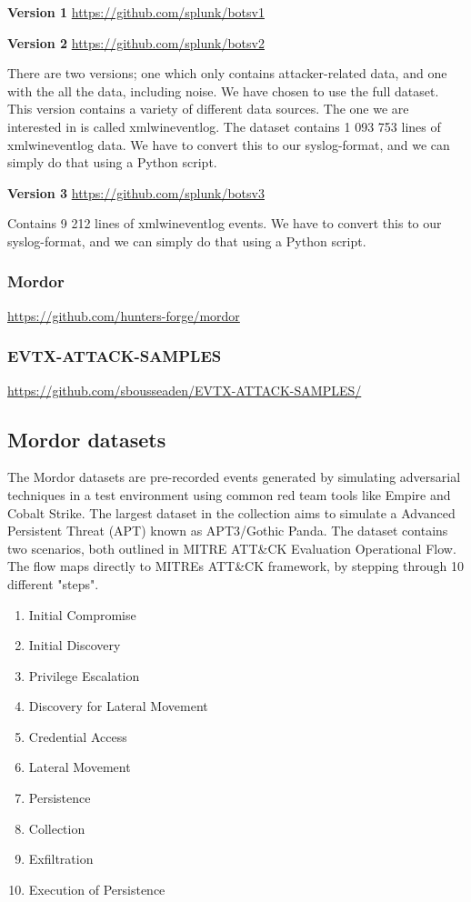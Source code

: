 \textbf{Version 1}
\url{https://github.com/splunk/botsv1}


\textbf{Version 2}
\url{https://github.com/splunk/botsv2}

There are two versions; one which only contains attacker-related data, and one with the all the data, including noise. We have chosen to use the full dataset. This version contains a variety of different data sources. The one we are interested in is called xmlwineventlog. The dataset contains 1 093 753 lines of xmlwineventlog data. We have to convert this to our syslog-format, and we can simply do that using a Python script.


\textbf{Version 3}
\url{https://github.com/splunk/botsv3}

Contains 9 212 lines of xmlwineventlog events. We have to convert this to our syslog-format, and we can simply do that using a Python script.

\subsubsection{Mordor}
\url{https://github.com/hunters-forge/mordor}

\subsubsection{EVTX-ATTACK-SAMPLES}
\url{https://github.com/sbousseaden/EVTX-ATTACK-SAMPLES/}



\subsection{Mordor datasets}
The Mordor datasets are pre-recorded events generated by simulating adversarial techniques in a test environment using common red team tools like Empire and Cobalt Strike. The largest dataset in the collection aims to simulate a Advanced Persistent Threat (APT) known as APT3/Gothic Panda. The dataset contains two scenarios, both outlined in MITRE ATT\&CK Evaluation Operational Flow. The flow maps directly to MITREs ATT\&CK framework, by stepping through 10 different "steps".

\begin{enumerate}
\item Initial Compromise
\item Initial Discovery
\item Privilege Escalation
\item Discovery for Lateral Movement
\item Credential Access
\item Lateral Movement
\item Persistence
\item Collection
\item Exfiltration
\item Execution of Persistence
\end{enumerate}

